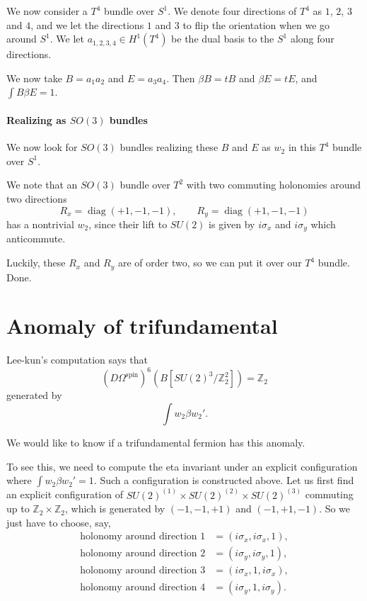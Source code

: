 \documentclass[12pt]{article}
\numberwithin{equation}{section}
\def\bZ{\mathbb{Z}}
\def\diag{\mathop{\mathrm{diag}}}
\begin{document}
We now consider a $T^4$ bundle over $S^1$. 
We denote four directions of $T^4$ as $1$, $2$, $3$ and $4$,
and we let the directions $1$ and $3$ to flip the orientation when we go around $S^1$.
We let $a_{1,2,3,4}\in H^1(T^4)$ be the dual basis to the $S^1$ along four directions.

We now take $B=a_1a_2$ and $E=a_3 a_4$.
Then $\beta B=tB$ and $\beta E=tE$, and $\int B\beta E=1$.

\paragraph{Realizing as $SO(3)$ bundles}

We now look for $SO(3)$ bundles realizing these $B$ and $E$ as $w_2$ in this $T^4$ bundle over $S^1$.

We note that an $SO(3)$ bundle over $T^2$ with two commuting holonomies around two directions \[
R_x = \diag(+1,-1,-1),\qquad
R_y = \diag(+1,-1,-1)
\] has a nontrivial $w_2$, since their lift to $SU(2)$ is given by $i\sigma_x$ and $i\sigma_y$ which anticommute.

Luckily, these $R_x$ and $R_y$ are of order two, so we can put it over our $T^4$ bundle. Done.

\section{Anomaly of trifundamental}

Lee-kun's computation says that \[
(D\Omega^\text{spin})^6 (B[SU(2)^3/\bZ_2^2]) = \bZ_2 
\] generated by \[
\int w_2 \beta w_2'.
\]

We would like to know if a trifundamental fermion has this anomaly.

To see this, we need to compute the eta invariant under an explicit configuration where $\int w_2 \beta w_2'=1$. 
Such a configuration is constructed above. 
Let us first find an explicit configuration of $SU(2)^{(1)}\times SU(2)^{(2)} \times SU(2)^{(3)}$ commuting up to $\bZ_2\times \bZ_2$, which is generated by $(-1,-1,+1)$ and $(-1,+1,-1)$.
So we just have to choose, say, \begin{align}
\text{holonomy around direction 1} &= (i\sigma_x, i\sigma_x, 1), \\
\text{holonomy around direction 2} &= (i\sigma_y, i\sigma_y, 1), \\
\text{holonomy around direction 3} &= (i\sigma_x, 1,i\sigma_x), \\
\text{holonomy around direction 4} &= (i\sigma_y, 1,i\sigma_y).
\end{align}
\end{document}

